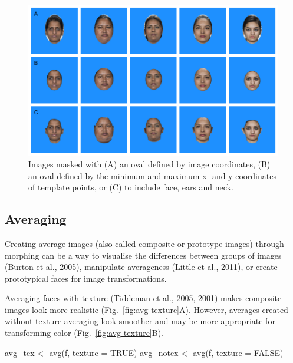 \documentclass[
  doc,floatsintext]{apa6}
\newenvironment{Shaded}{\begin{snugshade}}{\end{snugshade}}
\newcommand{\AttributeTok}[1]{\textcolor[rgb]{0.77,0.63,0.00}{#1}}
\newcommand{\ConstantTok}[1]{\textcolor[rgb]{0.00,0.00,0.00}{#1}}
\newcommand{\FunctionTok}[1]{\textcolor[rgb]{0.00,0.00,0.00}{#1}}
\newcommand{\NormalTok}[1]{#1}
\newcommand{\OtherTok}[1]{\textcolor[rgb]{0.56,0.35,0.01}{#1}}
\begin{document}
\begin{figure}
\includegraphics[width=1\linewidth]{index_files/figure-latex/mask-1} \caption{Images masked with (A) an oval defined by image coordinates, (B) an oval defined by the minimum and maximum x- and y-coordinates of template points, or (C) to include face, ears and neck.}\label{fig:mask}
\end{figure}

\hypertarget{averaging}{%
\subsection{Averaging}\label{averaging}}

Creating average images (also called composite or prototype images) through morphing can be a way to visualise the differences between groups of images (Burton et al., 2005), manipulate averageness (Little et al., 2011), or create prototypical faces for image transformations.

Averaging faces with texture (Tiddeman et al., 2005, 2001) makes composite images look more realistic (Fig.~\ref{fig:avg-texture}A). However, averages created without texture averaging look smoother and may be more appropriate for transforming color (Fig.~\ref{fig:avg-texture}B).

\begin{Shaded}
\begin{Highlighting}[]
\NormalTok{avg\_tex }\OtherTok{\textless{}{-}} \FunctionTok{avg}\NormalTok{(f, }\AttributeTok{texture =} \ConstantTok{TRUE}\NormalTok{)}
\NormalTok{avg\_notex }\OtherTok{\textless{}{-}} \FunctionTok{avg}\NormalTok{(f, }\AttributeTok{texture =} \ConstantTok{FALSE}\NormalTok{)}
\end{Highlighting}
\end{Shaded}
\end{document}
